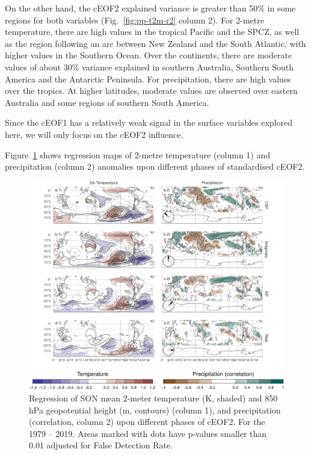 \documentclass[smallextended]{svjour3}       %
\begin{document}
On the other hand, the cEOF2 explained variance is greater than 50\% in some regions for both variables (Fig.~\ref{fig:pp-t2m-r2} column 2).
For 2-metre temperature, there are high values in the tropical Pacific and the SPCZ, as well as the region following an arc between New Zealand and the South Atlantic, with higher values in the Southern Ocean.
Over the continents, there are moderate values of about 30\% variance explained in southern Australia, Southern South America and the Antarctic Peninsula.
For precipitation, there are high values over the tropics. At higher latitudes, moderate values are observed over eastern Australia and some regions of southern South America.

Since the cEOF1 has a relatively weak signal in the surface variables explored here, we will only focus on the cEOF2 influence.

Figure~\ref{fig:pp-temp-2} shows regression maps of 2-metre temperature (column 1) and precipitation (column 2) anomalies upon different phases of standardised cEOF2.



\begin{figure}
\centering
\includegraphics{../figures/pp-temp-2-1.pdf}
\caption{\label{fig:pp-temp-2}Regression of SON mean 2-meter temperature (K, shaded) and 850 hPa geopotential height (m, contours) (column 1), and precipitation (correlation, column 2) upon different phases of cEOF2. For the 1979 -- 2019. Areas marked with dots have p-values smaller than 0.01 adjusted for False Detection Rate.}
\end{figure}
\end{document}
